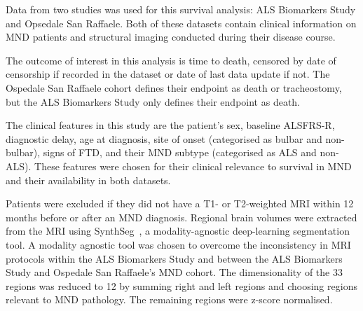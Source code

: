 Data from two studies was used for this survival analysis: ALS Biomarkers Study and Opsedale San Raffaele.
Both of these datasets contain clinical information on MND patients and structural imaging conducted during their disease course.

The outcome of interest in this analysis is time to death, censored by date of censorship if recorded in the dataset or date of last data update if not.
The Ospedale San Raffaele cohort defines their endpoint as death or tracheostomy, but the ALS Biomarkers Study only defines their endpoint as death.

The clinical features in this study are the patient's sex, baseline ALSFRS-R, diagnostic delay, age at diagnosis, site of onset (categorised as bulbar and non-bulbar), signs of FTD, and their MND subtype (categorised as ALS and non-ALS).
These features were chosen for their clinical relevance to survival in MND and their availability in both datasets.

Patients were excluded if they did not have a T1- or T2-weighted MRI within 12 months before or after an MND diagnosis.
Regional brain volumes were extracted from the MRI using SynthSeg~\cite{billotSynthSegDomainRandomisation2021}, a modality-agnostic deep-learning segmentation tool.
A modality agnostic tool was chosen to overcome the inconsistency in MRI protocols within the ALS Biomarkers Study and between the ALS Biomarkers Study and Ospedale San Raffaele's MND cohort.
The dimensionality of the 33 regions was reduced to 12 by summing right and left regions and choosing regions relevant to MND pathology.
The remaining regions were z-score normalised.

